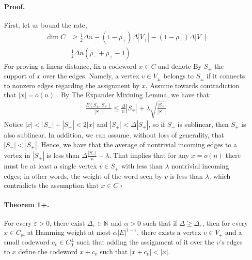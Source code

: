 \documentclass{article}
\begin{document}
\begin{multicols*}{2}
  \paragraph{Proof.} First, let us bound the rate, 
  \begin{equation*}
    \begin{split}
      \dim C & \ge \frac{1}{2}\Delta n - \left( 1 - \rho_{+} \right)\Delta|V_{+}| - \left( 1 - \rho_{-} \right)\Delta|V_{-}| \\
      & \frac{1}{2}\Delta n \left( \rho_{-} + \rho_{+}  - 1  \right) 
    \end{split}
  \end{equation*}
  For proving a linear distance, fix a codeword $x \in C$ and denote By $S_{\pm}$ the support of $x$ over the edges. Namely, a vertex $v\in V_{\pm}$ belongs to $S_{\pm}$ if it connects to nonzero edges regarding the assignment by $x$, Assume towards contradiction that $|x| = o\left( n \right)$ . By The Expander Mixining Lemma, we have that: 
  \begin{equation*}
    \begin{split}
      \frac{E\left( S_{\pm}, S_{\mp} \right)}{|S_{\pm}|}\le\frac{\Delta}{n}|S_{\mp}| + \lambda\sqrt{\frac{|S_{\mp}|}{|S_{\pm}|}}
    \end{split}
  \end{equation*}
  Notice $|x| < |S_{-}| + |S_{+}| < 2|x|$ and $|S_{\pm}| < \Delta |S_{\mp}|$, so if $S_{-}$ is sublinear, then $S_{+}$ is also sublinear. In addition, we can assume, without loss of generality, that $|S_{-}| < |S_{+}|$. Hence, we have that the average of nontrivial incoming edges to a vertex in $|S_{+}|$ is less than $ \Delta \frac{|S_{-}|}{n} + \lambda $. That implies that for any $x = o\left( n \right)$ there must be at least a single vertex $ v \in S_{+} $ with less than $ \lambda $ nontrivial incoming edges; in other words, the weight of the word seen by $v$ is less than $\lambda$, which contradicts the assumption that $x\in C$ $\square$

  \paragraph{Theorem 1+.} For every $\varepsilon > 0$, there exist $\Delta_{\varepsilon}\in \mathbb{N}$ and $\alpha>0$ such that if $\Delta \ge \Delta_{\varepsilon}$, then for every $x \in C_{\oplus}$ at Hamming weight at most $\alpha |E|^{1-\varepsilon}$, there exists a vertex $v \in V_{\pm}$ and a small codeword $c_{v} \in C_{0}^{\pm} $ such that adding the assignment of it over the $v$'s edges to $x$ define the codeword $x + c_{v}$  such that $|x + c_{v}| < |x|$.  


\end{multicols*}
\end{document}
